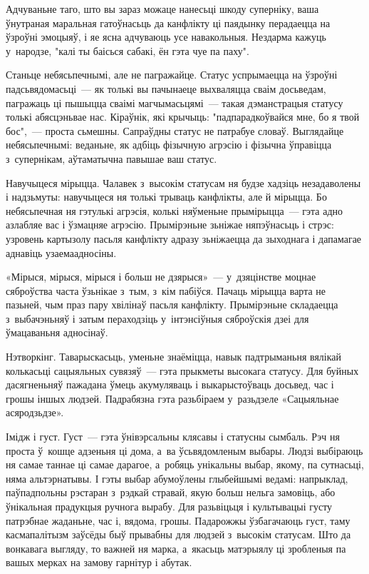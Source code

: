 Адчуваньне таго, што вы зараз можаце нанесьці шкоду суперніку, ваша ўнутраная маральная гатоўнасьць да канфлікту ці паядынку перадаецца на ўзроўні эмоцыяў, і яе ясна адчуваюць усе навакольныя. Нездарма кажуць у~народзе, "калі ты баісься сабакі, ён гэта чуе па паху".

Станьце небясьпечнымі, але не пагражайце. Статус успрымаецца на ўзроўні падсьвядомасьці~--- як толькі вы пачынаеце выхваляцца сваім досьведам, пагражаць ці пышыцца сваімі магчымасьцямі~--- такая дэманстрацыя статусу толькі абясцэньвае нас. Кіраўнік, які крычыць: "падпарадкоўвайся мне, бо я твой бос",~--- проста сьмешны. Сапраўдны статус не патрабуе словаў. Выглядайце небясьпечнымі: веданьне, як адбіць фізычную агрэсію і фізычна ўправіцца з~супернікам, аўтаматычна павышае ваш статус.

Навучыцеся мірыцца. Чалавек з~высокім статусам ня будзе хадзіць незадаволены і надзьмуты: навучыцеся ня толькі трываць канфлікты, але й мірыцца. Бо небясьпечная ня гэтулькі агрэсія, колькі няўменьне прымірыцца~--- гэта адно азлабляе вас і ўзмацняе агрэсію. Прымірэньне зьніжае няпэўнасьць і стрэс: узровень картызолу пасьля канфлікту адразу зьніжаецца да зыходнага і дапамагае аднавіць узаемаадносіны.

«Мірыся, мірыся, мірыся і больш не дзярыся»~--- у~дзяцінстве моцнае сяброўства часта ўзьнікае з~тым, з~кім пабіўся. Пачаць мірыцца варта не пазьней, чым праз пару хвілінаў пасьля канфлікту. Прымірэньне складаецца з~выбачэньняў і затым пераходзіць у~інтэнсіўныя сяброўскія дзеі для ўмацаваньня адносінаў.

Нэтворкінг. Таварыскасьць, уменьне знаёміцца, навык падтрыманьня вялікай колькасьці сацыяльных сувязяў~--- гэта прыкметы высокага статусу. Для буйных дасягненьняў пажадана ўмець акумуляваць і выкарыстоўваць досьвед, час і грошы іншых людзей. Падрабязна гэта разьбіраем у~разьдзеле «Сацыяльнае асяродзьдзе».

Імідж і густ. Густ~--- гэта ўнівэрсальны клясавы і статусны сымбаль. Рэч ня проста ў~кошце адзеньня ці дома, а~ва ўсьвядомленым выбары. Людзі выбіраюць ня самае таннае ці самае дарагое, а~робяць унікальны выбар, якому, па сутнасьці, няма альтэрнатывы. І гэты выбар абумоўлены глыбейшымі ведамі: напрыклад, паўпадпольны рэстаран з~рэдкай стравай, якую больш нельга замовіць, або ўнікальная прадукцыя ручнога вырабу. Для разьвіцьця і культывацыі густу патрэбнае жаданьне, час і, вядома, грошы. Падарожжы ўзбагачаюць густ, таму касмапалітызм заўсёды быў прывабны для людзей з~высокім статусам. Што да вонкавага выгляду, то важней ня марка, а~якасьць матэрыялу ці зробленыя па вашых мерках на замову гарнітур і абутак.

